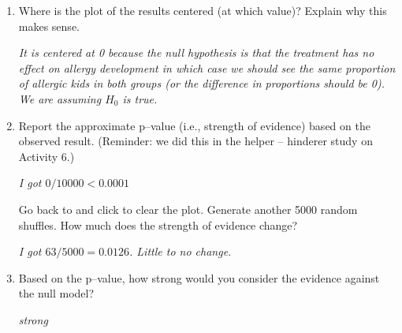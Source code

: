 \begin{enumerate}
   \item  Where is the plot of the results centered (at which value)?
     Explain why this makes sense. 
\begin{students}
\vspace{2cm}
\end{students}

\begin{key}
  {\it       It is centered at 0 because 
     the null hypothesis is that the treatment has no effect on
     allergy development in which case we should see the same proportion of
     allergic kids in both groups (or the difference in
     proportions should be 0). We are assuming $H_0$ is true. }
\end{key}

   \item  
     Report the approximate p--value (i.e., strength of evidence) based
     on the observed result. (Reminder: we did this in the helper --
     hinderer study on Activity 6.)
\begin{students}
\vspace{1cm}
\end{students}

\begin{key}
  {\it  I got $0/10000 < 0.0001$}
\end{key}

       Go back to  and click  to clear
       the plot. Generate another 5000 random shuffles. How  much does
       the strength of evidence change?
\begin{students}
 \vspace{1cm}
\end{students}

\begin{key}
  {\it I got $63/5000 =0.0126$. Little to no change. }
\end{key}
\vspace{1cm} 


    \item  Based on the p--value, how strong would you consider the
      evidence against the null model?  
\begin{students}
\vspace{1cm}
\end{students}

\begin{key}
  {\it    strong}
\end{key}



\end{enumerate}
